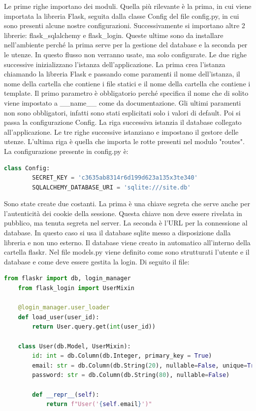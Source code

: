 Le prime righe importano dei moduli.
Quella più rilevante è la prima, in cui viene importata la libreria Flask,
seguita dalla classe Config del file config.py, in cui sono presenti alcune nostre configurazioni.
Successivamente si importano altre 2 librerie: flask\_sqlalchemy e flask\_login.
Queste ultime sono da installare nell'ambiente perché la prima serve per la gestione del database e la seconda per le utenze.
In questo flusso non verranno usate, ma solo configurate.\newline
Le due righe successive inizializzano l'istanza dell'applicazione.
La prima crea l'istanza chiamando la libreria Flask e passando come paramenti il nome dell'istanza, 
il nome della cartella che contiene i file statici e il nome della cartella che contiene i template.
Il primo parametro è obbligatorio perché specifica il nome che di solito viene impostato a \_\_name\_\_ come da documentazione.
Gli ultimi paramenti non sono obbligatori, infatti sono stati esplicitati solo i valori di default.
Poi si passa la configurazione Config.
La riga successiva istanzia il database collegato all'applicazione.
Le tre righe successive istanziano e impostano il gestore delle utenze.
L'ultima riga è quella che importa le rotte presenti nel modulo "routes".\newline
\newline
La configurazione presente in config.py è:
\begin{lstlisting}[language=python]
	class Config:
		SECRET_KEY = 'c3635ab8314r6d199d623a135x3te340'
		SQLALCHEMY_DATABASE_URI = 'sqlite:///site.db'
\end{lstlisting}
Sono state create due costanti.
La prima è una chiave segreta che serve anche per l'autenticità dei cookie della sessione.
Questa chiave non deve essere rivelata in pubblico, ma tenuta segreta nel server.
La seconda è l'URL per la connessione al database.
In questo caso si usa il database sqlite messo a disposizione dalla libreria e non uno esterno.
Il database viene creato in automatico all'interno della cartella flaskr.\newline
\newline
Nel file models.py viene definito come sono strutturati l'utente e il database e come deve essere gestita la login. 
Di seguito il file:
\begin{lstlisting}[language=python]
	from flaskr import db, login_manager
	from flask_login import UserMixin

	@login_manager.user_loader
	def load_user(user_id):
		return User.query.get(int(user_id))

	class User(db.Model, UserMixin):
		id: int = db.Column(db.Integer, primary_key = True)
		email: str = db.Column(db.String(20), nullable=False, unique=True)
		password: str = db.Column(db.String(80), nullable=False)

		def __repr__(self):
			return f"User('{self.email}')"
\end{lstlisting}
